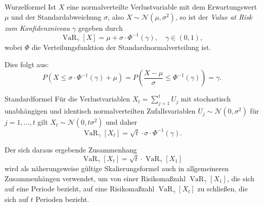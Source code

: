 \begin{example}{Wurzelformel}
    Ist $X$ eine normalverteilte Verlustvariable mit dem Erwartungswert $\mu$ und der Standardabweichung $\sigma$, also $X \sim \mathcal{N}(\mu, \sigma^2)$, so ist der \emph{Value at Risk zum Konfidenzniveau $\gamma$} gegeben durch
    \[
        \operatorname{VaR}_{\gamma}[X] = \mu + \sigma \cdot \Phi^{-1}(\gamma), \quad \gamma \in (0, 1),
    \]
    wobei $\Phi$ die Verteilungsfunktion der Standardnormalverteilung ist.

    Dies folgt aus:
    \[
        P\left( X \leq \sigma \cdot \Phi^{-1}(\gamma) + \mu \right) = P \left( \frac{X - \mu}{\sigma} \leq \Phi^{-1}(\gamma) \right) = \gamma.
    \]
\end{example}

\begin{example}{Standardformel}
    Für die Verlustvariablen $X_{t}=\sum _{j=1}^{t}U_{j}$ mit stochastisch unabhängigen und identisch normalverteilten Zufallsvariablen $U_{j}\sim {\mathcal {N}}(0,\sigma ^{2})$ für $j=1,\dots ,t$ gilt $X_{t}\sim {\mathcal {N}}(0,t\sigma ^{2})$ und daher
    \[
        \operatorname{VaR}_{\gamma}[X_{t}] = \sqrt {t} \cdot \sigma \cdot \Phi^{-1}(\gamma).
    \]

    Der sich daraus ergebende Zusammenhang
    \[
        \operatorname{VaR}_{\gamma}[X_{t}] = \sqrt {t} \cdot \operatorname{VaR}_{\gamma}[X_{1}]
    \]
    wird als näherungsweise gültige Skalierungsformel auch in allgemeineren Zusammenhängen verwendet, um von einer Risikomaßzahl $\operatorname{VaR}_{\gamma}[X_{1}]$, die sich auf eine Periode bezieht, auf eine Risikomaßzahl $\operatorname{VaR}_{\gamma}[X_{t}]$ zu schließen, die sich auf $t$ Perioden bezieht.
\end{example}